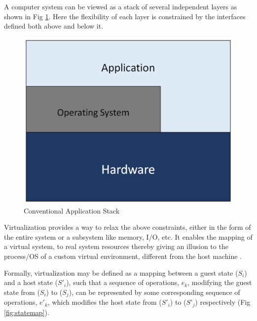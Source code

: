 A computer system can be viewed as a stack of several independent layers as shown in Fig \ref{fig:appstack}. Here the flexibility of each layer is constrained by the interfaces defined both above and below it. 

\setlength{\belowcaptionskip}{-10pt}

\begin{figure}[H]
  \centering
  \includegraphics[scale=0.6]{figures/app_stack.png}
  \caption{Conventional Application Stack}
  \label{fig:appstack}
\end{figure}

Virtualization provides a way to relax the above constraints, either in the form of the entire system or a subsystem like memory, I/O, etc. It enables the mapping of a virtual system, to real system resources thereby giving an illusion to the process/OS of a custom virtual environment, different from the host machine \cite{virt_arch}.

Formally, virtualization may be defined as a mapping between a guest state ($S_i$) and a host state ($S'_i$), such that a sequence of operations, $e_k$, modifying the guest state from ($S_i$) to ($S_j$), can be represented by some corresponding sequence of operations, $e'_k$, which modifies the host state from ($S'_i$) to ($S'_j$) respectively \cite{smith_nair} (Fig \ref{fig:statemap}). 

\setlength{\belowcaptionskip}{-10pt}

